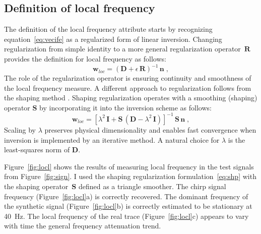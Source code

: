 \subsection{Definition of local frequency}

The definition of the local frequency attribute starts by recognizing
equation~\ref{eq:vecife} as a regularized form of linear
inversion. Changing regularization from simple identity to a more
general regularization operator~$\mathbf{R}$ provides the definition
for local frequency as follows:
\begin{equation}
  \label{eq:reg}
  \mathbf{w}_{loc} = 
  \left(\mathbf{D}+\epsilon\,\mathbf{R}\right)^{-1}\,\mathbf{n}\;,
\end{equation}
The role of the regularization operator is ensuring continuity and
smoothness of the local frequency measure. A different approach to
regularization  follows from the shaping method
\cite[]{shape2}. Shaping regularization operates with a smoothing
(shaping) operator $\mathbf{S}$ by incorporating it into the inversion
scheme as follows:
\begin{equation}
  \label{eq:shp}
  \mathbf{w}_{loc} = \left[\lambda^2\,\mathbf{I} + 
    \mathbf{S}\,\left(\mathbf{D} - \lambda^2\,\mathbf{I}\right)\right]^{-1}\,
  \mathbf{S}\,\mathbf{n}\;,
\end{equation}
Scaling by $\lambda$ preserves physical dimensionality and enables
fast convergence when inversion is implemented by an iterative method.
A natural choice for $\lambda$ is the least-squares norm of
$\mathbf{D}$.

Figure~\ref{fig:locl} shows the results of measuring local frequency
in the test signals from Figure~\ref{fig:sign}. I used the shaping
regularization formulation~\ref{eq:shp} with the shaping
operator~$\mathbf{S}$ defined as a triangle smoother. The chirp signal
frequency (Figure~\ref{fig:locl}a) is correctly recovered.  The
dominant frequency of the synthetic signal (Figure~\ref{fig:locl}b) is
correctly estimated to be stationary at 40~Hz. The local frequency of
the real trace (Figure~\ref{fig:locl}c) appears to vary with time
  the general frequency attenuation trend.


